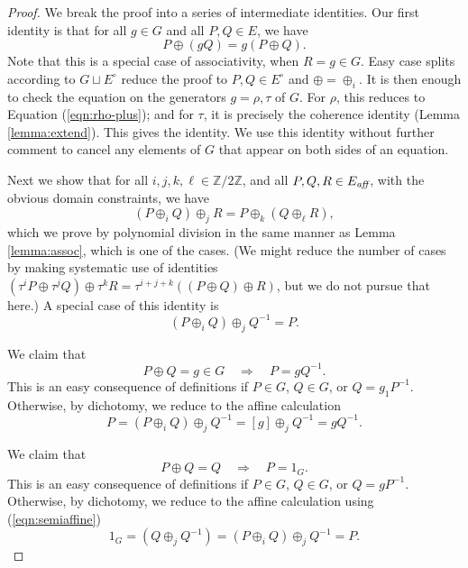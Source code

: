 \documentclass[12pt]{article}
\newcommand{\ring}[1]{\mathbb{#1}}
\newcommand{\op}[1]{\hbox{#1}}
\newcommand{\Eaff}{E_{\op{\scriptsize\it aff}}}
\newcommand{\Eoo}{E^{\circ}}
\newcommand{\hplus}{\oplus}
\begin{document}
\begin{proof}  
  We break the proof into a series of intermediate identities.  Our
  first identity is that for all $g\in G$ and all $P,Q\in E$, we have
\[
P\hplus (g Q) = g (P\hplus Q).
\]
Note that this is a special case of associativity, when $R=g\in G$.  
Easy case splits according to $G\sqcup
\Eoo$ reduce the proof to $P,Q\in \Eoo$ and $\hplus =\oplus_i$.  It is
then enough to check the equation on the generators $g=\rho,\tau$ of
$G$.  For $\rho$, this reduces to Equation (\ref{eqn:rho-plus}); and
for $\tau$, it is precisely the coherence identity (Lemma
\ref{lemma:extend}).  This gives the identity.  We use this
identity without further comment to cancel any elements of $G$ that
appear on both sides of an equation.

Next we show that for all $i,j,k,\ell\in \ring{Z}/2\ring{Z}$, and all
$P,Q,R\in \Eaff$, with the obvious domain constraints, we have
\begin{equation}\label{eqn:assoc-affine}
(P\oplus_i Q) \oplus_j R = P \oplus_k (Q \oplus_\ell R),
\end{equation}
which we prove by polynomial division in the same manner as
Lemma \ref{lemma:assoc}, which is one of the cases.  (We might
reduce the number of cases by making systematic use of identities
$(\tau^i P\oplus\tau^j Q)\oplus \tau^k R = \tau^{i+j+k} ((P\oplus
Q)\oplus R)$, but we do not pursue that here.) A special case of this
identity is
\begin{equation}\label{eqn:semiaffine}
(P\oplus_i Q) \oplus_j Q^{-1} = P.
\end{equation}

We claim that 
\begin{equation}\label{eqn:g-cancel}
P\oplus Q = g\in G\quad\Rightarrow\quad P = g Q^{-1}.
\end{equation}
This is an easy consequence of definitions if $P\in G$, $Q\in G$, or
$Q = g_1 P^{-1}$.  Otherwise, by dichotomy, we reduce to the affine
calculation
\[
P = (P\oplus_i Q)\oplus_j Q^{-1} = [g]\oplus_j Q^{-1} = g Q^{-1}.
\]

We claim that
\begin{equation}\label{eqn:cancel}
P \oplus Q = Q \quad \Rightarrow\quad P = 1_G.
\end{equation}
This is an easy consequence of definitions if $P\in G$, $Q\in G$, or
$Q = gP^{-1}$.  Otherwise, by dichotomy, we reduce to the affine
calculation using (\ref{eqn:semiaffine})
\[
1_G = (Q \oplus_j Q^{-1}) = (P\oplus_i Q)\oplus_j Q^{-1} = P.
\]


\end{proof}
\end{document}
